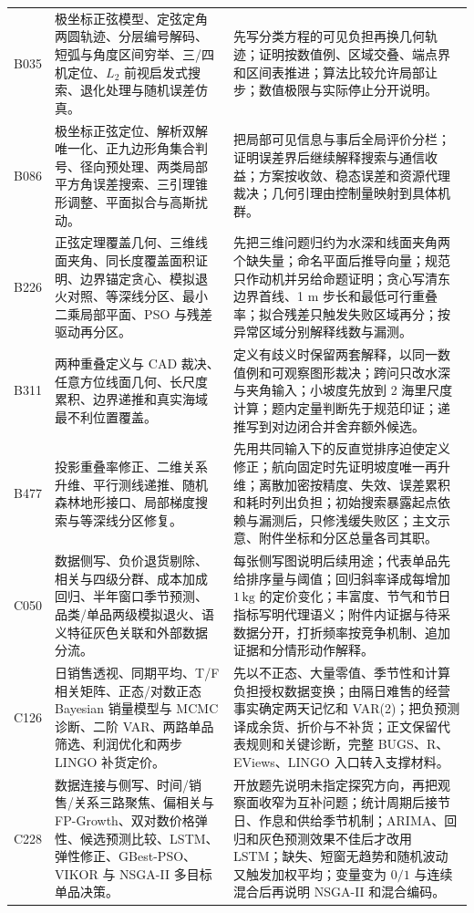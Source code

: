 \documentclass[UTF8,a4paper,12pt]{ctexart}
\begin{document}
\begin{longtable}{p{1.4cm}p{5.2cm}p{7.0cm}}
B035 & 极坐标正弦模型、定弦定角两圆轨迹、分层编号解码、短弧与角度区间穷举、三/四机定位、$L_2$ 前视启发式搜索、退化处理与随机误差仿真。 &
先写分类方程的可见负担再换几何轨迹；证明按数值例、区域交叠、端点界和区间表推进；算法比较允许局部让步；数值极限与实际停止分开说明。\\
B086 & 极坐标正弦定位、解析双解唯一化、正九边形角集合判号、径向预处理、两类局部平方角误差搜索、三引理锥形调整、平面拟合与高斯扰动。 &
把局部可见信息与事后全局评价分栏；证明误差界后继续解释搜索与通信收益；方案按收敛、稳态误差和资源代理裁决；几何引理由控制量映射到具体机群。\\
B226 & 正弦定理覆盖几何、三维线面夹角、同长度覆盖面积证明、边界锚定贪心、模拟退火对照、等深线分区、最小二乘局部平面、PSO 与残差驱动再分区。 &
先把三维问题归约为水深和线面夹角两个缺失量；命名平面后推导向量；规范只作动机并另给命题证明；贪心写清东边界首线、1 m 步长和最低可行重叠率；拟合残差只触发失败区域再分；按异常区域分别解释线数与漏测。\\
B311 & 两种重叠定义与 CAD 裁决、任意方位线面几何、长尺度累积、边界递推和真实海域最不利位置覆盖。 &
定义有歧义时保留两套解释，以同一数值例和可观察图形裁决；跨问只改水深与夹角输入；小坡度先放到 2 海里尺度计算；题内定量判断先于规范印证；递推写到对边闭合并舍弃额外候选。\\
B477 & 投影重叠率修正、二维关系升维、平行测线递推、随机森林地形接口、局部梯度搜索与等深线分区修复。 &
先用共同输入下的反直觉排序迫使定义修正；航向固定时先证明坡度唯一再升维；离散加密按精度、失效、误差累积和耗时列出负担；初始搜索暴露起点依赖与漏测后，只修浅缓失败区；主文示意、附件坐标和分区总量各司其职。\\
C050 & 数据侧写、负价退货剔除、相关与四级分群、成本加成回归、半年窗口季节预测、品类/单品两级模拟退火、语义特征灰色关联和外部数据分流。 &
每张侧写图说明后续用途；代表单品先给排序量与阈值；回归斜率译成每增加 $1\,\mathrm{kg}$ 的定价变化；丰富度、节气和节日指标写明代理语义；附件内证据与待采数据分开，打折频率按竞争机制、追加证据和分情形动作解释。\\
C126 & 日销售透视、同期平均、T/F 相关矩阵、正态/对数正态 Bayesian 销量模型与 MCMC 诊断、二阶 VAR、两路单品筛选、利润优化和两步 LINGO 补货定价。 &
先以不正态、大量零值、季节性和计算负担授权数据变换；由隔日难售的经营事实确定两天记忆和 VAR(2)；把负预测译成余货、折价与不补货；正文保留代表规则和关键诊断，完整 BUGS、R、EViews、LINGO 入口转入支撑材料。\\
C228 & 数据连接与侧写、时间/销售/关系三路聚焦、偏相关与 FP-Growth、双对数价格弹性、候选预测比较、LSTM、弹性修正、GBest-PSO、VIKOR 与 NSGA-II 多目标单品决策。 &
开放题先说明未指定探究方向，再把观察面收窄为互补问题；统计周期后接节日、作息和供给季节机制；ARIMA、回归和灰色预测效果不佳后才改用 LSTM；缺失、短窗无趋势和随机波动又触发加权平均；变量变为 $0/1$ 与连续混合后再说明 NSGA-II 和混合编码。\\

\end{longtable}
\end{document}

